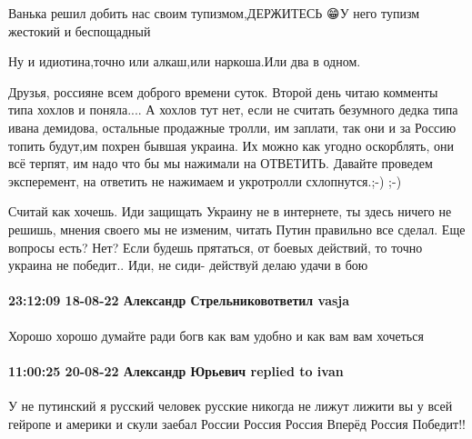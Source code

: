 Ванька решил добить нас своим тупизмом,ДЕРЖИТЕСЬ 😁У него тупизм жестокий и беспощадный 🤗😅

Ну и идиотина,точно или алкаш,или наркоша.Или два в одном.


Друзья, россияне всем доброго времени суток. Второй день читаю комменты типа
хохлов и поняла.... А хохлов тут нет, если не считать безумного дедка типа
ивана демидова, остальные продажные тролли, им заплати, так они и за Россию
топить будут,им похрен бывшая украина. Их можно как угодно оскорблять, они всё
терпят, им надо что бы мы нажимали на ОТВЕТИТЬ. Давайте проведем эксперемент,
на ответить не нажимаем и укротролли схлопнутся.;-) ;-)


Считай как хочешь. Иди защищать Украину не в интернете, ты здесь ничего не
решишь, мнения своего мы не изменим, читать Путин правильно все сделал. Еще
вопросы есть? Нет? Если будешь прятаться, от боевых действий, то точно украина
не победит.. Иди, не сиди- действуй делаю удачи в бою




\paragraph{23:12:09 18-08-22 Александр Стрельниковответил vasja}

Хорошо хорошо думайте ради богв как вам удобно и как вам вам хочеться

\paragraph{11:00:25 20-08-22 Александр Юрьевич replied to ivan}

У не путинский я русский человек русские никогда не лижут лижити вы у всей
гейропе и америки и скули заебал России Россия Россия Вперёд Россия Победит!!
